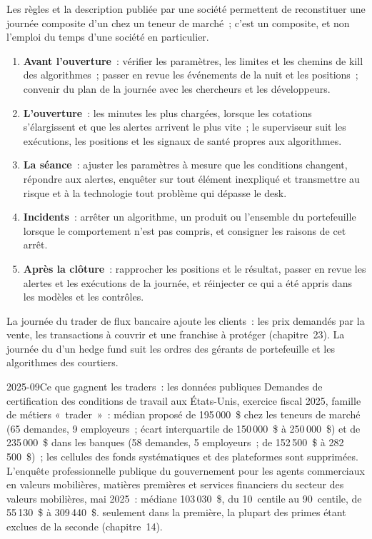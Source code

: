 Les règles et la description publiée par une société permettent de reconstituer une journée composite d'un  chez un teneur de marché~;
c'est un composite, et non l'emploi du temps d'une société en particulier.
\begin{enumerate}
\item \textbf{Avant l'ouverture}~: vérifier les paramètres, les limites et les chemins de kill des algorithmes~; passer en revue les événements de la nuit et
les positions~; convenir du plan de la journée avec les chercheurs et les développeurs.
\item \textbf{L'ouverture}~: les minutes les plus chargées, lorsque les cotations s'élargissent et que les alertes arrivent le plus vite~; le superviseur suit les exécutions, les
positions et les signaux de santé propres aux algorithmes.
\item \textbf{La séance}~: ajuster les paramètres à mesure que les conditions changent, répondre aux alertes, enquêter sur tout élément inexpliqué et
transmettre au risque et à la technologie tout problème qui dépasse le desk.
\item \textbf{Incidents}~: arrêter un algorithme, un produit ou l'ensemble du portefeuille lorsque le comportement n'est pas compris, et consigner les raisons de cet arrêt.
\item \textbf{Après la clôture}~: rapprocher les positions et le résultat, passer en revue les alertes et les exécutions de la journée, et réinjecter ce qui
a été appris dans les modèles et les contrôles.
\end{enumerate}
La journée du trader de flux bancaire ajoute les clients~: les prix demandés par la vente, les transactions à couvrir et une franchise à protéger
(chapitre~23). La journée du  d'un hedge fund suit les ordres des gérants de portefeuille et les algorithmes des courtiers.

\begin{dated}{2025-09}{Ce que gagnent les traders~: les données publiques}\label{dat:in:trader:pay}
Demandes de certification des conditions de travail aux États-Unis, exercice fiscal 2025, famille de métiers «~trader~»~:  médian proposé de 195\,000~\$ chez les teneurs de marché
(65 demandes, 9 employeurs~; écart interquartile de 150\,000~\$ à 250\,000~\$) et de 235\,000~\$ dans les banques (58 demandes, 5
employeurs~; de 152\,500~\$ à 282\,500~\$)~; les cellules des fonds systématiques et des plateformes sont supprimées. L'enquête professionnelle publique du gouvernement
pour les agents commerciaux en valeurs mobilières, matières premières et services financiers du secteur des valeurs mobilières, mai 2025~: médiane
103\,030~\$, du 10~centile au 90~centile, de 55\,130~\$ à 309\,440~\$.  seulement dans la première, la plupart des primes étant exclues de la
seconde (chapitre~14).
\end{dated}

